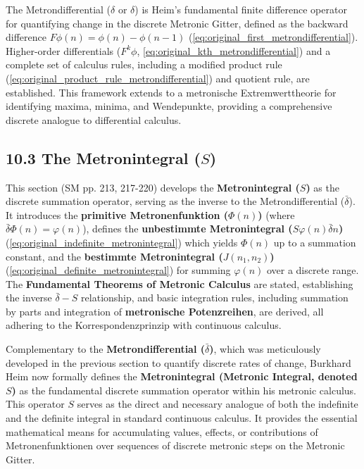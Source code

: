 \documentclass[12pt]{article}
\newcommand{\metrondifferential}{\delta}
\newcommand{\metronintegral}{S}
\begin{document}
The Metrondifferential (\(\metrondifferential\) or \(\delta\)) is Heim's fundamental finite difference operator for quantifying change in the discrete Metronic Gitter, defined as the backward difference \( F\phi(n) = \phi(n) - \phi(n-1) \) (\eqref{eq:original_first_metrondifferential}). Higher-order differentials (\(F^k\phi\), \eqref{eq:original_kth_metrondifferential}) and a complete set of calculus rules, including a modified product rule (\eqref{eq:original_product_rule_metrondifferential}) and quotient rule, are established. This framework extends to a metronische Extremwerttheorie for identifying maxima, minima, and Wendepunkte, providing a comprehensive discrete analogue to differential calculus.

\subsection{10.3 The Metronintegral (\texorpdfstring{\( \metronintegral \)}{S})}
\label{sec:metronintegral}

This section (SM pp. 213, 217-220) develops the \textbf{Metronintegral (\(\metronintegral\))} as the discrete summation operator, serving as the inverse to the Metrondifferential (\(\bar{\delta}\)). It introduces the \textbf{primitive Metronenfunktion (\(\Phi(n)\))} (where \(\bar{\delta}\Phi(n) = \varphi(n)\)), defines the \textbf{unbestimmte Metronintegral (\( S\varphi(n)\bar{\delta}n \))} (\eqref{eq:original_indefinite_metronintegral}) which yields \(\Phi(n)\) up to a summation constant, and the \textbf{bestimmte Metronintegral (\( J(n_1, n_2) \))} (\eqref{eq:original_definite_metronintegral}) for summing \(\varphi(n)\) over a discrete range. The \textbf{Fundamental Theorems of Metronic Calculus} are stated, establishing the inverse \(\bar{\delta}-S\) relationship, and basic integration rules, including summation by parts and integration of \textbf{metronische Potenzreihen}, are derived, all adhering to the Korrespondenzprinzip with continuous calculus.

Complementary to the \textbf{Metrondifferential (\( \bar{\delta} \))}, which was meticulously developed in the previous section to quantify discrete rates of change, Burkhard Heim now formally defines the \textbf{Metronintegral (Metronic Integral, denoted \( \metronintegral \))} as the fundamental discrete summation operator within his metronic calculus. This operator \( \metronintegral \) serves as the direct and necessary analogue of both the indefinite and the definite integral in standard continuous calculus. It provides the essential mathematical means for accumulating values, effects, or contributions of Metronenfunktionen over sequences of discrete metronic steps on the Metronic Gitter.
\end{document}
